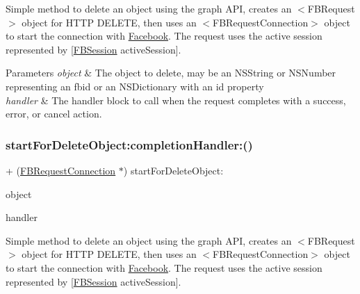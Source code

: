 Simple method to delete an object using the graph A\+PI, creates an $<$\+F\+B\+Request$>$ object for H\+T\+TP D\+E\+L\+E\+TE, then uses an $<$\+F\+B\+Request\+Connection$>$ object to start the connection with \hyperlink{interfaceFacebook}{Facebook}. The request uses the active session represented by {\ttfamily \mbox{[}\hyperlink{interfaceFBSession}{F\+B\+Session} active\+Session\mbox{]}}.


\begin{DoxyParams}{Parameters}
{\em object} & The object to delete, may be an N\+S\+String or N\+S\+Number representing an fbid or an N\+S\+Dictionary with an id property \\
\hline
{\em handler} & The handler block to call when the request completes with a success, error, or cancel action. \\
\hline
\end{DoxyParams}
\mbox{\label{interfaceFBRequestConnection_a3fc3ae420d8e47fd0b7a6b915622c527}} 
\subsubsection{\texorpdfstring{start\+For\+Delete\+Object\+:completion\+Handler\+:()}{startForDeleteObject:completionHandler:()}\hspace{0.1cm}{\footnotesize\ttfamily [2/5]}}
{\footnotesize\ttfamily + (\hyperlink{interfaceFBRequestConnection}{F\+B\+Request\+Connection} $\ast$) start\+For\+Delete\+Object\+: \begin{DoxyParamCaption}\item[{(id)}]{object }\item[{completionHandler:(F\+B\+Request\+Handler)}]{handler }\end{DoxyParamCaption}}

Simple method to delete an object using the graph A\+PI, creates an $<$\+F\+B\+Request$>$ object for H\+T\+TP D\+E\+L\+E\+TE, then uses an $<$\+F\+B\+Request\+Connection$>$ object to start the connection with \hyperlink{interfaceFacebook}{Facebook}. The request uses the active session represented by {\ttfamily \mbox{[}\hyperlink{interfaceFBSession}{F\+B\+Session} active\+Session\mbox{]}}.


